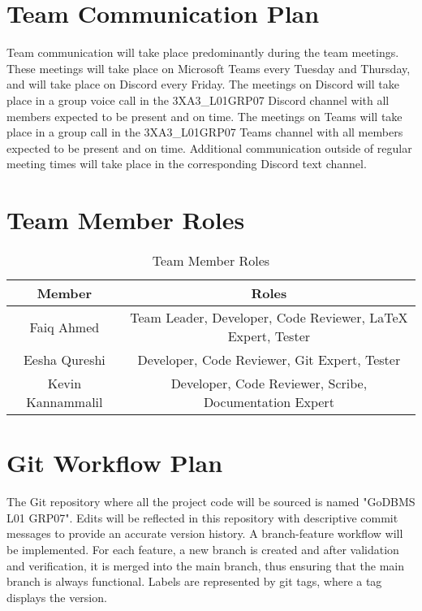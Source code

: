 \documentclass[12pt,letterpaper]{article}
\begin{document}
\section{Team Communication Plan}

Team communication will take place predominantly during the team meetings. These meetings will take place on Microsoft Teams every Tuesday and Thursday, and will take place on Discord every Friday. The meetings on Discord will take place in a group voice call in the 3XA3\_L01GRP07 Discord channel with all members expected to be present and on time. The meetings on Teams will take place in a group call in the 3XA3\_L01GRP07 Teams channel with all members expected to be present and on time. Additional communication outside of regular meeting times will take place in the corresponding Discord text channel.

\section{Team Member Roles}

\begin{table}[H]
    \centering
    \begin{tabular}{ |c|c| } 
    \hline
    Member & Roles \\
    \hline
    Faiq Ahmed & Team Leader, Developer, Code Reviewer, LaTeX Expert, Tester\\
    Eesha Qureshi & Developer, Code Reviewer, Git Expert, Tester \\
    Kevin Kannammalil & Developer, Code Reviewer, Scribe, Documentation Expert \\
    \hline
    \end{tabular}
    \caption{Team Member Roles}
    \label{tab:memberroles}
\end{table}

\section{Git Workflow Plan}

The Git repository where all the project code will be sourced is named "GoDBMS L01 GRP07". Edits will be reflected in this repository with descriptive commit messages to provide an accurate version history. A branch-feature workflow will be implemented. For each feature, a new branch is created and after validation and verification, it is merged into the main branch, thus ensuring that the main branch is always functional. Labels are represented by git tags, where a tag displays the version.  
\end{document}
